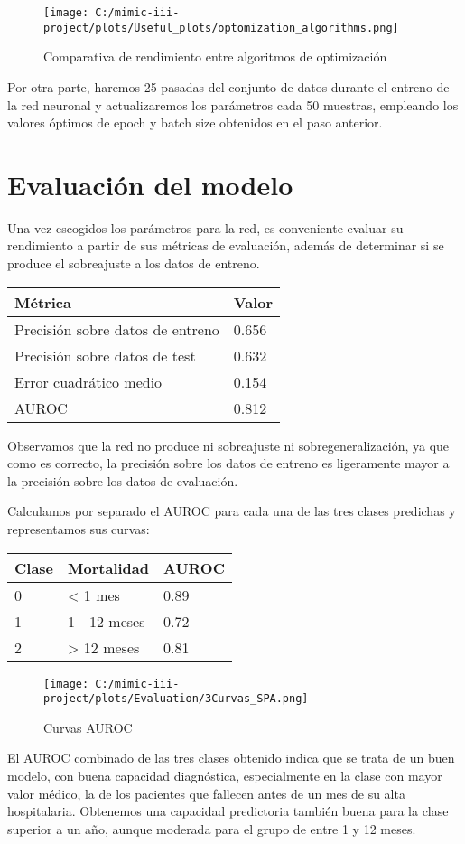 \documentclass{report}
\begin{document}
\begin{figure}[H]
\centering
\texttt{[image: C:/mimic-iii-project/plots/Useful\_plots/optomization\_algorithms.png]}
\caption{Comparativa de rendimiento entre algoritmos de optimización}
\end{figure}

Por otra parte, haremos 25 pasadas del conjunto de datos durante el
entreno de la red neuronal y actualizaremos los parámetros cada 50
muestras, empleando los valores óptimos de epoch y batch size obtenidos
en el paso anterior.
\newpage
\section{Evaluación del modelo}
Una vez escogidos los parámetros para la red, es conveniente evaluar su
rendimiento a partir de sus métricas de evaluación, además de determinar
si se produce el sobreajuste a los datos de entreno.
\begin{longtable}[]{@{}ll@{}}
\toprule
Métrica & Valor\tabularnewline
\midrule
\endhead
Precisión sobre datos de entreno & 0.656\tabularnewline
Precisión sobre datos de test & 0.632\tabularnewline
Error cuadrático medio & 0.154\tabularnewline
AUROC & 0.812\tabularnewline
\bottomrule
\end{longtable}
Observamos que la red no produce ni sobreajuste ni sobregeneralización,
ya que como es correcto, la precisión sobre los datos de entreno es
ligeramente mayor a la precisión sobre los datos de evaluación.

Calculamos por separado el AUROC para cada una de las tres clases
predichas y representamos sus curvas:

\begin{longtable}[]{@{}lll@{}}
\toprule
Clase & Mortalidad & AUROC\tabularnewline
\midrule
\endhead
0 & \textless{} 1 mes & 0.89\tabularnewline
1 & 1 - 12 meses & 0.72\tabularnewline
2 & \textgreater{} 12 meses & 0.81\tabularnewline
\bottomrule
\end{longtable}
\begin{figure}[H]
\centering
\texttt{[image: C:/mimic-iii-project/plots/Evaluation/3Curvas\_SPA.png]}
\caption{Curvas AUROC}
\end{figure}

El AUROC combinado de las tres clases obtenido indica que se trata de un
buen modelo, con buena capacidad diagnóstica, especialmente en la clase
con mayor valor médico, la de los pacientes que fallecen antes de un mes
de su alta hospitalaria. Obtenemos una capacidad predictoria también
buena para la clase superior a un año, aunque moderada para el grupo de
entre 1 y 12 meses.
\end{document}
